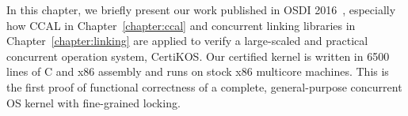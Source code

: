 
In this chapter, we briefly present our work published in OSDI 2016~\cite{certikos:osdi16}, especially 
how CCAL in Chapter~\ref{chapter:ccal} and concurrent linking libraries in Chapter~\ref{chapter:linking} are applied 
to verify a large-scaled and practical concurrent operation system, CertiKOS.
Our certified kernel is written in 6500 lines of C and x86 assembly
and runs on stock x86 multicore machines. This is
the first proof of functional correctness of a complete,
general-purpose concurrent OS kernel with fine-grained locking.